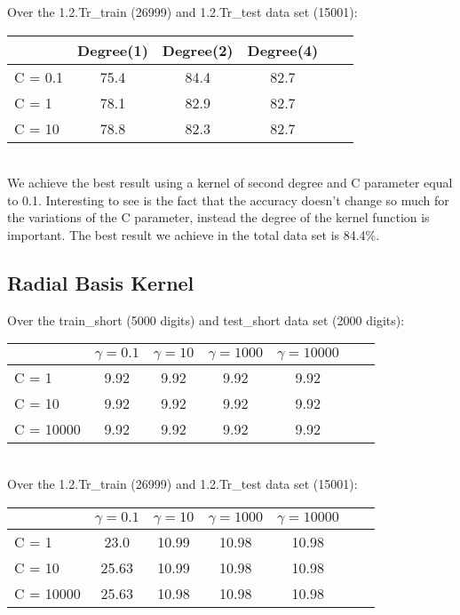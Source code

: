 \documentclass[11pt,a4paper]{article}
\begin{document}
Over the  1.2.Tr\_train (26999) and  1.2.Tr\_test data set (15001): \\

\begin{tabular}{l*{4}{c}r}
	& Degree(1) & Degree(2) & Degree(4) \\
\hline
C = 0.1	&	75.4	& 	84.4	&	82.7 \\ 
C = 1	&	78.1	&	82.9	&	82.7 \\
C = 10  &	78.8	&	82.3	&	82.7 \\
\end{tabular} \\

We achieve the best result using a kernel of second degree and C parameter equal to 0.1. Interesting to see is the fact that the accuracy doesn't change so much for the variations of the C parameter, instead the degree of the kernel function is important. The best result we achieve in the total data set is 84.4\%.      

\subsection{Radial Basis Kernel}

Over the train\_short (5000 digits) and test\_short data set (2000 digits):\\

\begin{tabular}{l*{5}{c}r}
	& $\gamma = 0.1$  & $\gamma = 10$   & $\gamma = 1000$  & $\gamma = 10000$  \\
\hline
C = 1		&	9.92	& 	9.92	&	9.92 	& 	9.92 \\ 
C = 10		&	9.92	&	9.92	&	9.92 	&	9.92 \\
C = 10000  	&	9.92	&	9.92	&	9.92 	&	9.92 \\
\end{tabular} \\

Over the  1.2.Tr\_train (26999) and  1.2.Tr\_test data set (15001): \\

\begin{tabular}{l*{5}{c}r}
	& $\gamma = 0.1$  & $\gamma = 10$   & $\gamma = 1000$  & $\gamma = 10000$  \\
\hline
C = 1		&	23.0	& 	10.99	&	10.98 	& 	10.98 \\ 
C = 10		&	25.63	&	10.99	&	10.98 	&	10.98 \\
C = 10000  	&	25.63	&	10.98	&	10.98 	&	10.98 \\
\end{tabular} \\
\end{document}
